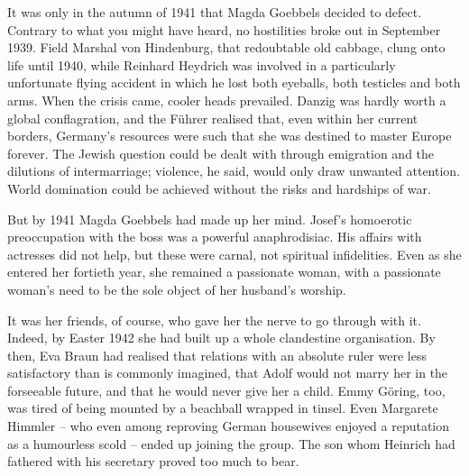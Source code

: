 
It was only in the autumn of 1941 that Magda Goebbels decided to defect. Contrary to what you might have heard, no hostilities broke out in September 1939. Field Marshal von Hindenburg, that redoubtable old cabbage, clung onto life until 1940, while Reinhard Heydrich was involved in a particularly unfortunate flying accident in which he lost both eyeballs, both testicles and both arms. When the crisis came, cooler heads prevailed. Danzig was hardly worth a global conflagration, and the F\"uhrer realised that, even within her current borders, Germany's resources were such that she was destined to master Europe forever. The Jewish question could be dealt with through emigration and the dilutions of intermarriage; violence, he said, would only draw unwanted attention. World domination could be achieved without the risks and hardships of war.

But by 1941 Magda Goebbels had made up her mind. Josef's homoerotic preoccupation with the boss was a powerful anaphrodisiac. His affairs with actresses did not help, but these were carnal, not spiritual infidelities. Even as she entered her fortieth year, she remained a passionate woman, with a passionate woman's need to be the sole object of her husband's worship.

It was her friends, of course, who gave her the nerve to go through with it. Indeed, by Easter 1942 she had built up a whole clandestine organisation. By then, Eva Braun had realised that relations with an absolute ruler were less satisfactory than is commonly imagined, that Adolf would not marry her in the forseeable future, and that he would never give her a child. Emmy G\"oring, too, was tired of being mounted by a beachball wrapped in tinsel. Even Margarete Himmler -- who even among reproving German housewives enjoyed a reputation as a humourless scold -- ended up joining the group. The son whom Heinrich had fathered with his secretary proved too much to bear.

